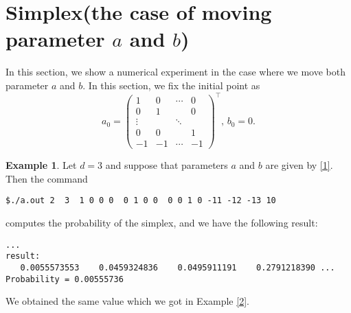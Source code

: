 \documentclass[12pt]{article}
\theoremstyle{definition}
\newtheorem{example}{Example}
\begin{document}
\section{Simplex(the case of moving parameter $a$ and $b$)}
In this section, we show a numerical experiment in the case where
we move both parameter $a$ and $b$.
In this section, we fix the initial point as
$$
a_0 = 
\begin{pmatrix} 
  1 & 0 & \cdots & 0\\
  0 & 1 &        & 0\\
  \vdots & & \ddots & \\
  0 & 0 &        & 1\\
  -1 & -1 & \cdots & -1
\end{pmatrix}^\top
,\,b_0 = 0.
$$
\begin{example}
Let $d=3$ and suppose that parameters $a$ and $b$ are given by \eqref{1}.
Then the command 
\begin{framed}
\begin{verbatim}
$./a.out 2  3  1 0 0 0  0 1 0 0  0 0 1 0 -11 -12 -13 10
\end{verbatim}
\end{framed}
computes the probability of the simplex, and we have the following result:
\begin{framed}
\begin{verbatim}
...
result:
   0.0055573553    0.0459324836    0.0495911191    0.2791218390 ...
Probability = 0.00555736
\end{verbatim}
\end{framed}
We obtained the same value which we got in Example \ref{2}.
\end{example}
\end{document}
